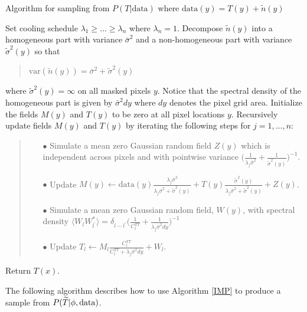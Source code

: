 \documentclass[iop,revtex4,apj,onecolumn]{emulateapj}
\begin{document}
\begin{algorithm}[H]
\small
\caption{Algorithm for sampling from $P(T | \text{data})$ where $\text{data}(y) =  T(y) + \tilde n(y)$}
\label{IMP}
\begin{algorithmic}[1]
\State Set cooling schedule $\lambda_1\geq  \ldots \geq \lambda_n$ where $\lambda_n = 1$. 
\State Decompose $\tilde n(y)$ into a homogeneous part with variance
$\bar\sigma^2$ and a non-homogeneous part with variance $\tilde\sigma^{2}(y)$ so that 
\begin{quote}
$\text{var}(\tilde n(y)) = \bar\sigma^2 + \tilde\sigma^{2}(y)$ 
\end{quote}
where $\tilde \sigma^2(y) = \infty$ on all masked pixels $y$. Notice that the spectral density of the homogeneous part is given by $ \bar\sigma^2 dy$ where  $dy$ denotes the pixel grid area. 
\State Initialize the fields $M(y)$ and $T(y)$  to be zero at all pixel locations $y$.
\State Recursively update fields $M(y)$ and $T(y)$ by iterating the following steps for $j = 1, \ldots, n$:
\begin{quote}
\begin{itemize}
\item[$\bullet$] Simulate a mean zero Gaussian random field $Z(y)$ which is independent across pixels and with pointwise variance $\bigl(\frac{1}{\lambda_j\bar\sigma^{2}} + \frac{1}{\tilde\sigma^{2}(y)}\bigr)^{-1}$.
\item[$\bullet$] Update 
$M(y) \leftarrow \text{data}(y)\displaystyle\frac{\lambda_j\bar\sigma^{2}}{\lambda_j \bar\sigma^2 + \tilde \sigma^2(y)} + T(y)\frac{\tilde\sigma^{2}(y)}{\lambda_j\bar\sigma^2 + \tilde \sigma^2(y)}  + Z(y) $.
\item[$\bullet$] Simulate a mean zero Gaussian random field, $W(y)$, with spectral density
$\langle W_l W_{l^\prime}^*\rangle = \delta_{l-l^\prime}\bigl( \frac{1}{C^{TT}_l} + \frac{1}{\lambda_j \bar\sigma^2 dy} \bigr)^{-1}$
\item[$\bullet$] Update  $T_l \leftarrow  M_l\displaystyle\frac{C^{TT}_l}{C^{TT}_l + \lambda_j   \bar\sigma^2 dy} + W_l$. 
\end{itemize}
\end{quote}
\State Return $T(x)$.
\end{algorithmic}
\end{algorithm}




The following algorithm describes how to use Algorithm \ref{IMP} to produce a sample from $ P(\widetilde T |  \phi,\text{\rm data})$.
\end{document}
